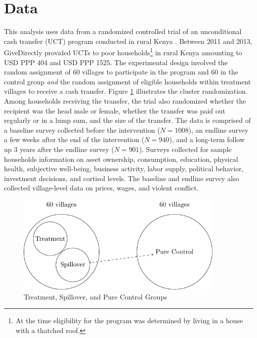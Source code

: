 \documentclass[11pt]{article}
\begin{document}
\section{Data}

    This analysis uses data from a randomized controlled trial of an unconditional cash transfer (UCT) program conducted in rural Kenya \parencite{haushofer_short-term_2016}. Between 2011 and 2013, GiveDirectly provided UCTs to poor households\footnote{At the time eligibility for the program was determined by living in a house with a thatched roof.} in rural Kenya amounting to USD PPP 404 and USD PPP 1525. The experimental design involved the random assignment of 60 villages to participate in the program and 60 in the control group \textit{and} the random assignment of eligible households within treatment villages to receive a cash transfer. Figure \ref{fig:design} illustrates the cluster randomization. Among households receiving the transfer, the trial also randomized whether the recipient was the head male or female, whether the transfer was paid out regularly or in a lump sum, and the size of the transfer. The data is comprised of a baseline survey collected before the intervention ($N=1008$), an endline survey a few weeks after the end of the intervention ($N=940$), and a long-term follow up 3 years after the endline survey ($N=901$). Surveys collected for sample households information on asset ownership, consumption, education, physical health, subjective well-being, business activity, labor supply, political behavior, investment decisions, and cortisol levels. The baseline and endline survey also collected village-level data on prices, wages, and violent conflict.

    \begin{figure}[H]
    	\centering
	\includegraphics[width=0.9\textwidth]{../Figs/TikzFig.pdf}
    	\caption{Treatment, Spillover, and Pure Control Groups}
        \label{fig:design}
    \end{figure}
\end{document}
